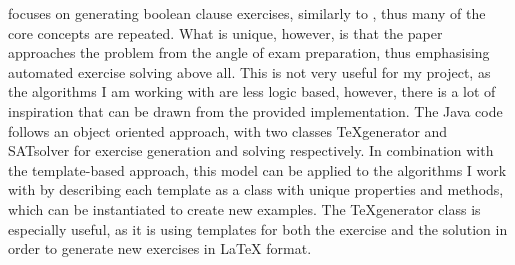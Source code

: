 \documentclass{l4proj}
\begin{document}
\citet{Esh22} focuses on generating boolean clause exercises, similarly to \citet{Hoz21}, thus many of the core concepts are repeated. What is unique, however, is that the paper approaches the problem from the angle of exam preparation, thus emphasising automated exercise solving above all. This is not very useful for my project, as the algorithms I am working with are less logic based, however, there is a lot of inspiration that can be drawn from the provided implementation. The Java code follows an object oriented approach, with two classes TeXgenerator and SATsolver for exercise generation and solving respectively. In combination with the template-based approach, this model can be applied to the algorithms I work with by describing each template as a class with unique properties and methods, which can be instantiated to create new examples. The TeXgenerator class is especially useful, as it is using templates for both the exercise and the solution in order to generate new exercises in LaTeX format. 
\end{document}
